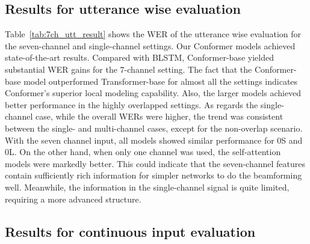 \documentclass{article}
\begin{document}
	\subsection{Results for  utterance wise evaluation}
	
	Table~\ref{tab:7ch_utt_result} shows the WER of the utterance wise evaluation for the seven-channel and single-channel settings. 
	Our Conformer models achieved state-of-the-art results. Compared with BLSTM,  Conformer-base
	yielded substantial WER gains for the 7-channel setting.
The fact that 
	the Conformer-base model outperformed Transformer-base for almost all the settings indicates  Conformer's superior local modeling capability. Also, the larger models achieved better performance in the highly overlapped settings. 
As regards the single-channel case, 
	while the overall WERs were higher, 
the trend was consistent between the single- and multi-channel cases, except for the non-overlap scenario. With the seven channel input, all models showed similar performance for 0S and 0L.
	On the other hand, when only one channel was used,  
	the self-attention models were markedly better. This could indicate that the seven-channel features contain sufficiently rich information for simpler networks to do the beamforming well. Meanwhile, the information in the single-channel signal is quite limited, requiring a more advanced structure.


	


	


	
	\subsection{Results for continuous input evaluation}
	
\end{document}
